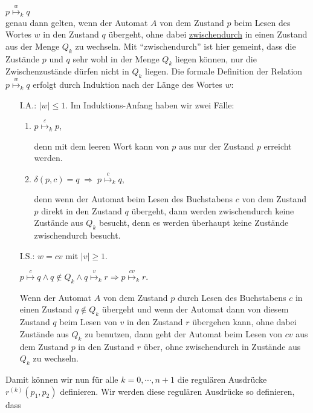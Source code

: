 \hspace*{1.3cm}
$p \stackrel{w}{\mapsto}_k q$
\\[0.2cm]
genau dann gelten, wenn der Automat $A$ von dem Zustand $p$ beim Lesen des Wortes $w$ in
den Zustand $q$ \"ubergeht, ohne dabei \underline{zwischendurch} in einen Zustand aus der
Menge $Q_k$ zu wechseln.  Mit ``zwischendurch'' ist hier gemeint, dass die Zust\"ande $p$
und $q$ sehr wohl in der Menge $Q_k$ liegen k\"onnen, nur die Zwischenzust\"ande d\"urfen nicht in $Q_k$
liegen.  Die formale Definition der Relation  
$p \stackrel{w}{\mapsto}_k q$ erfolgt durch Induktion nach der L\"ange des Wortes $w$:
\begin{enumerate}
\item[I.A.:] $|w| \leq 1$.  Im Induktions-Anfang haben wir zwei F\"alle:
  \begin{enumerate}
  \item $p \stackrel{\varepsilon}{\mapsto}_k p$,

        denn mit dem leeren Wort kann von $p$ aus nur der Zustand $p$ erreicht
        werden.
  \item $\delta(p, c) = q \;\Rightarrow\; p \stackrel{c}{\mapsto}_k q$,

        denn wenn der Automat beim Lesen des Buchstabens $c$ von dem Zustand $p$ direkt
        in den Zustand $q$ \"ubergeht, dann werden zwischendurch keine Zust\"ande aus $Q_k$
        besucht, denn es werden \"uberhaupt keine Zust\"ande zwischendurch besucht.
  \end{enumerate}
\item[I.S.:] $w = cv$ mit $|v| \geq 1$.

             \hspace*{1.3cm}
            $p \stackrel{c}{\mapsto} q \wedge q \not\in Q_k \wedge q \stackrel{v}{\mapsto}_k r
              \Rightarrow p \stackrel{cv}{\mapsto}_k r$.

             Wenn der Automat $A$ von dem Zustand $p$ durch Lesen des Buchstabens $c$
             in einen  Zustand $q \notin Q_k$ \"ubergeht und wenn der Automat dann von
             diesem Zustand $q$ beim Lesen von $v$ in den Zustand $r$ \"ubergehen kann, ohne
             dabei Zust\"ande aus $Q_k$ zu benutzen, dann geht der Automat beim Lesen von
             $cv$ aus dem Zustand $p$ in den Zustand $r$ \"uber,
             ohne zwischendurch in Zust\"ande aus $Q_k$ zu wechseln.
\end{enumerate}
Damit k\"onnen wir nun f\"ur alle $k=0,\cdots,n+1$ die regul\"aren Ausdr\"ucke
$r^{(k)}(p_1, p_2)$ definieren.  Wir werden diese regul\"aren Ausdr\"ucke so definieren, dass
